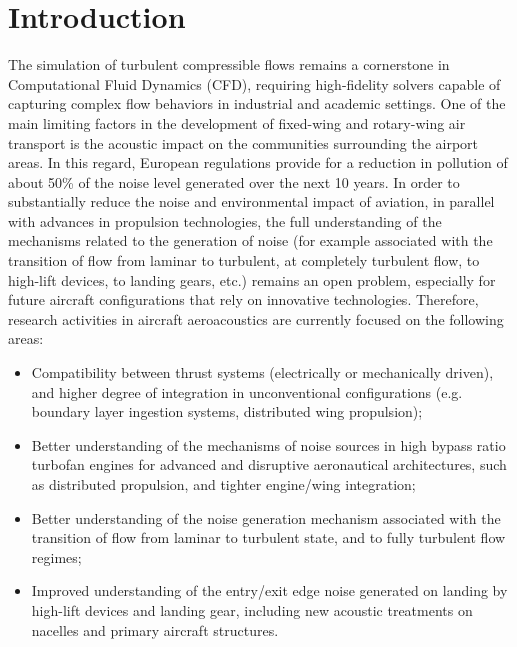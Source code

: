 \documentclass[a5paper]{sapthesis}
\begin{document}
	\tableofcontents

	\listoffigures
	\listoftables
	\cleardoublepage
	
	\chapter{Introduction}
	\label{chap:intro}
	
	The simulation of turbulent compressible flows remains a cornerstone in Computational Fluid Dynamics (CFD), requiring high-fidelity solvers capable of capturing complex flow behaviors in industrial and academic settings. One of the main limiting factors in the development of fixed-wing and rotary-wing air transport is the acoustic impact on the communities surrounding the airport areas. In this regard, European regulations provide for a reduction in pollution of about 50\% of the noise level generated over the next 10 years. In order to substantially reduce the noise and environmental impact of aviation, in parallel with advances in propulsion technologies, the full understanding of the mechanisms related to the generation of noise (for example associated with the transition of flow from laminar to turbulent, at completely turbulent flow, to high-lift devices, to landing gears, etc.) remains an open problem, especially for future aircraft configurations that rely on innovative technologies. Therefore, research activities in aircraft aeroacoustics are currently focused on the following areas:
	
	\begin{itemize}%
		\item
		Compatibility between thrust systems (electrically or mechanically driven), and higher degree of
		integration in unconventional configurations (e.g. boundary layer ingestion systems, distributed wing propulsion);
		\item 
		Better understanding of the mechanisms of noise sources in high bypass ratio turbofan engines for advanced and disruptive aeronautical architectures, such as distributed propulsion, and tighter engine/wing integration;
		\item 
		Better understanding of the noise generation mechanism associated with the transition of flow from laminar to turbulent state, and to fully turbulent flow regimes;
		\item 
		Improved understanding of the entry/exit edge noise generated on landing by high-lift devices and landing gear, including new acoustic treatments on nacelles and primary aircraft structures.
	\end{itemize}
	
\end{document}
